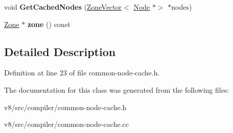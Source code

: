 \begin{DoxyCompactItemize}
\item 
\mbox{\label{classv8_1_1internal_1_1compiler_1_1CommonNodeCache_abba084098ae8ba5bf59ca10aa8c25ef8}} 
void {\bfseries Get\+Cached\+Nodes} (\mbox{\hyperlink{classv8_1_1internal_1_1ZoneVector}{Zone\+Vector}}$<$ \mbox{\hyperlink{classv8_1_1internal_1_1compiler_1_1Node}{Node}} $\ast$$>$ $\ast$nodes)
\item 
\mbox{\label{classv8_1_1internal_1_1compiler_1_1CommonNodeCache_a92e035316bd3728896c9319c90a52bd9}} 
\mbox{\hyperlink{classv8_1_1internal_1_1Zone}{Zone}} $\ast$ {\bfseries zone} () const
\end{DoxyCompactItemize}


\subsection{Detailed Description}


Definition at line 23 of file common-\/node-\/cache.\+h.



The documentation for this class was generated from the following files\+:\begin{DoxyCompactItemize}
\item 
v8/src/compiler/common-\/node-\/cache.\+h\item 
v8/src/compiler/common-\/node-\/cache.\+cc\end{DoxyCompactItemize}
